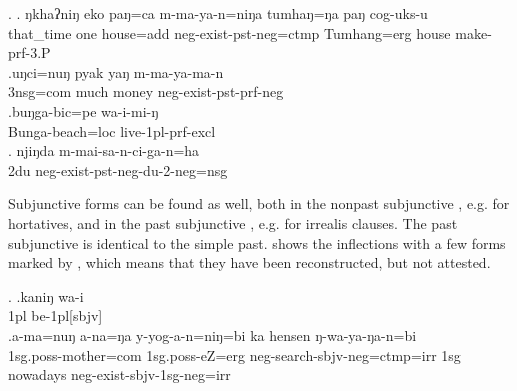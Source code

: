 \ex. \ag.     ŋkhaʔniŋ eko paŋ=ca         m-ma-ya-n=niŋa       tumhaŋ=ŋa   paŋ  cog-uks-u\\
that\_time one house{\sc =add} {\sc neg-}exist{\sc [3sg]-pst-neg=ctmp} Tumhang{\sc =erg} house make{\sc -prf-3.P}\\
 
\bg.uŋci=nuŋ   pyak yaŋ  m-ma-ya-ma-n\\
{\sc 3nsg=com} much money {\sc neg-}exist{\sc [3sg]-pst-prf-neg}\\
 
\bg.buŋga-bic=pe      wa-i-mi-ŋ\\
Bunga-beach{\sc =loc} live{\sc -1pl-prf-excl}\\
 
\bg. njiŋda m-mai-sa-n-ci-ga-n=ha\\
{\sc 2du} {\sc neg-}exist{\sc -pst-neg-du-2-neg=nsg}\\
         


Subjunctive forms can be found as well, both in the nonpast subjunctive \Next[a], e.g. for hortatives, and in the past subjunctive \Next[b], e.g. for irrealis clauses. The past subjunctive is identical to the simple past.   shows the  inflections with a few forms marked by , which means that they  have been reconstructed, but not attested.

\ex. \ag.kaniŋ wa-i\\
{\sc 1pl} be{\sc -1pl[sbjv]}\\
\bg.a-ma=nuŋ a-na=ŋa y-yog-a-n=niŋ=bi ka hensen ŋ-wa-ya-ŋa-n=bi\\
{\sc 1sg.poss-}mother{\sc =com} {\sc 1sg.poss-}eZ{\sc =erg} {\sc neg-}search{\sc -sbjv-neg=ctmp=irr} {\sc 1sg} nowadays {\sc neg-}exist{\sc -sbjv-1sg-neg=irr} \\
 

%

